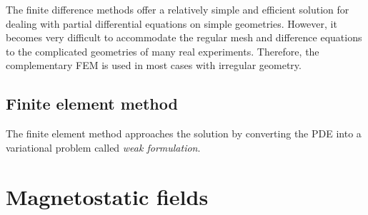 The finite difference methods offer a relatively simple and efficient solution
for dealing with partial differential equations on simple geometries.
However, it becomes very difficult to accommodate the regular mesh
and difference equations to
the complicated geometries of many real experiments.
Therefore, the complementary \ac{FEM} is used in
most cases with irregular geometry.

\subsection{Finite element method}
The finite element method approaches the solution by converting the
\ac{PDE} into a variational problem called {\em weak formulation}.

\section{Magnetostatic fields}
